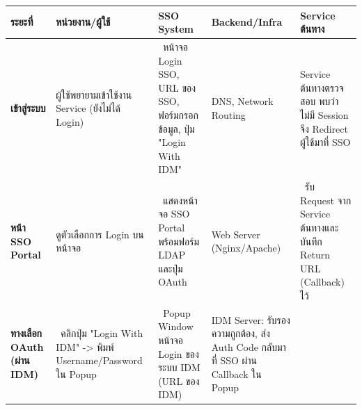 \begin{tabular}{|p{3cm}|p{3cm}|p{3cm}|p{3cm}|p{3cm}|}
\hline
\textbf{ระยะที่} & \textbf{หน่วยงาน/ผู้ใช้} & \textbf{SSO System} & \textbf{Backend/Infra} & \textbf{Service ต้นทาง} \\
\hline
\textbf{เข้าสู่ระบบ} & \begin{minipage}[t]{2.5cm}\raggedright
ผู้ใช้พยายามเข้าใช้งาน Service (ยังไม่ได้ Login)
\end{minipage} & \begin{minipage}[t]{2.5cm}\raggedright
\ หน้าจอ Login SSO, URL ของ SSO, ฟอร์มกรอกข้อมูล, ปุ่ม "Login With IDM"
\end{minipage} & \begin{minipage}[t]{2.5cm}\raggedright
DNS, Network Routing
\end{minipage} & \begin{minipage}[t]{2.5cm}\raggedright
Service ต้นทางตรวจสอบ พบว่าไม่มี Session จึง Redirect ผู้ใช้มาที่ SSO
\end{minipage} \\
\hline
\textbf{หน้า SSO Portal} & \begin{minipage}[t]{2.5cm}\raggedright
ดูตัวเลือกการ Login บนหน้าจอ
\end{minipage} & \begin{minipage}[t]{2.5cm}\raggedright
\ แสดงหน้าจอ SSO Portal พร้อมฟอร์ม LDAP และปุ่ม OAuth
\end{minipage} & \begin{minipage}[t]{2.5cm}\raggedright
Web Server (Nginx/Apache)
\end{minipage} & \begin{minipage}[t]{2.5cm}\raggedright
\ รับ Request จาก Service ต้นทางและบันทึก Return URL (Callback) ไว้
\end{minipage} \\
\hline
\textbf{ทางเลือก OAuth (ผ่าน IDM)} & \begin{minipage}[t]{2.5cm}\raggedright
\ คลิกปุ่ม "Login With IDM" -> พิมพ์ Username/Password ใน Popup
\end{minipage} & \begin{minipage}[t]{2.5cm}\raggedright
\ Popup Window หน้าจอ Login ของระบบ IDM (URL ของ IDM)
\end{minipage} & \begin{minipage}[t]{2.5cm}\raggedright
IDM Server: รับรองความถูกต้อง, ส่ง Auth Code กลับมาที่ SSO ผ่าน Callback ใน Popup
\end{minipage} & \begin{minipage}[t]{2.5cm}\raggedright

\end{minipage}
\end{tabular}
